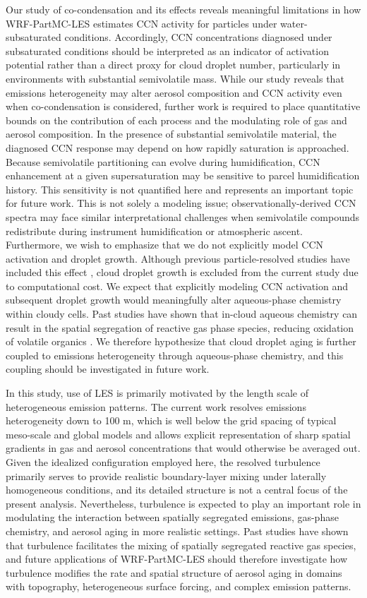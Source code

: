 \documentclass[acp, manuscript]{copernicus}
\begin{document}
Our study of co-condensation and its effects reveals meaningful limitations in how WRF-PartMC-LES estimates CCN activity for particles under water-subsaturated conditions. Accordingly, CCN concentrations diagnosed under subsaturated conditions should be interpreted as an indicator of activation potential rather than a direct proxy for cloud droplet number, particularly in environments with substantial semivolatile mass. While our study reveals that emissions heterogeneity may alter aerosol composition and CCN activity even when co-condensation is considered, further work is required to place quantitative bounds on the contribution of each process and the modulating role of gas and aerosol composition. In the presence of substantial semivolatile material, the diagnosed CCN response may depend on how rapidly saturation is approached. Because semivolatile partitioning can evolve during humidification, CCN enhancement at a given supersaturation may be sensitive to parcel humidification history. This sensitivity is not quantified here and represents an important topic for future work. This is not solely a modeling issue; observationally-derived CCN spectra may face similar interpretational challenges when semivolatile compounds redistribute during instrument humidification or atmospheric ascent. Furthermore, we wish to emphasize that we do not explicitly model CCN activation and droplet growth. Although previous particle-resolved studies have included this effect \citep{ching_impacts_2012}, cloud droplet growth is excluded from the current study due to computational cost. We expect that explicitly modeling CCN activation and subsequent droplet growth would meaningfully alter aqueous-phase chemistry within cloudy cells. Past studies have shown that in-cloud aqueous chemistry can result in the spatial segregation of reactive gas phase species, reducing oxidation of volatile organics \citep{li_impact_2017}. We therefore hypothesize that cloud droplet aging is further coupled to emissions heterogeneity through aqueous-phase chemistry, and this coupling should be investigated in future work.

In this study, use of LES is primarily motivated by the length scale
of heterogeneous emission patterns. The current work resolves
emissions heterogeneity down to 100 m, which is well below the grid
spacing of typical meso-scale and global models and allows explicit
representation of sharp spatial gradients in gas and aerosol
concentrations that would otherwise be averaged out. Given the
idealized configuration employed here, the resolved turbulence
primarily serves to provide realistic boundary-layer mixing under
laterally homogeneous conditions, and its detailed structure is not a
central focus of the present analysis. Nevertheless, turbulence is
expected to play an important role in modulating the interaction
between spatially segregated emissions, gas-phase chemistry, and
aerosol aging in more realistic settings. Past studies have shown that
turbulence facilitates the mixing of spatially segregated reactive gas
species, and future applications of WRF-PartMC-LES should therefore
investigate how turbulence modifies the rate and spatial structure of
aerosol aging in domains with topography, heterogeneous surface
forcing, and complex emission patterns.
\end{document}
